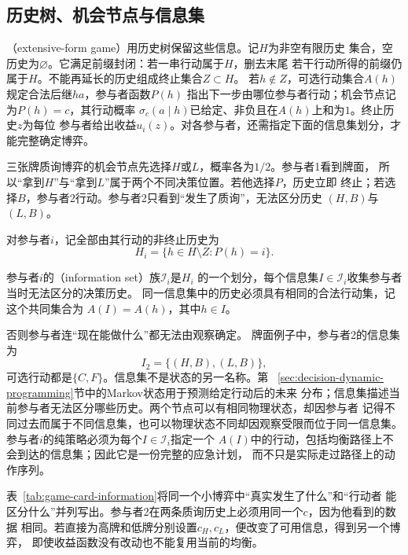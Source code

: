 \subsection{历史树、机会节点与信息集}

\begin{definition}[有限扩展式博弈的历史树]
\label{def:game-finite-extensive-history}
（extensive-form game）用历史树保留这些信息。记\(H\)为非空有限历史
集合，空历史为\(\varnothing\)。它满足前缀封闭：若一串行动属于\(H\)，删去末尾
若干行动所得的前缀仍属于\(H\)。不能再延长的历史组成终止集合\(Z\subset H\)。
若\(h\notin Z\)，可选行动集合\(A(h)\)规定合法后继\(ha\)，参与者函数\(P(h)\)
指出下一步由哪位参与者行动；机会节点记为\(P(h)=c\)，其行动概率
\(\sigma_c(a\mid h)\)已给定、非负且在\(A(h)\)上和为\(1\)。终止历史\(z\)为每位
参与者给出收益\(u_i(z)\)。对各参与者，还需指定下面的信息集划分，才能完整确定博弈。
\end{definition}

三张牌质询博弈的机会节点先选择\(H\)或\(L\)，概率各为\(1/2\)。参与者1看到牌面，
所以“拿到\(H\)”与“拿到\(L\)”属于两个不同决策位置。若他选择\(P\)，历史立即
终止；若选择\(B\)，参与者2行动。参与者2只看到“发生了质询”，无法区分历史
\((H,B)\)与\((L,B)\)。

对参与者\(i\)，记全部由其行动的非终止历史为
\[
  H_i=\{h\in H\setminus Z:P(h)=i\}.
\]
\begin{definition}[信息集]
\label{def:game-information-set}
参与者\(i\)的（information set）族\(\mathcal{I}_i\)是\(H_i\)
的一个划分，每个信息集\(I\in\mathcal{I}_i\)收集参与者当时无法区分的决策历史。
同一信息集中的历史必须具有相同的合法行动集，记这个共同集合为
\(A(I)=A(h)\)，其中\(h\in I\)。
\end{definition}
否则参与者连“现在能做什么”都无法由观察确定。
牌面例子中，参与者2的信息集为
\[
  I_2=\{(H,B),(L,B)\},
\]
可选行动都是\(\{C,F\}\)。信息集不是状态的另一名称。第
~\ref{sec:decision-dynamic-programming}节中的Markov状态用于预测给定行动后的未来
分布；信息集描述当前参与者无法区分哪些历史。两个节点可以有相同物理状态，却因参与者
记得不同过去而属于不同信息集，也可以物理状态不同却因观察受限而位于同一信息集。
参与者\(i\)的纯策略必须为每个\(I\in\mathcal{I}_i\)指定一个
\(A(I)\)中的行动，包括均衡路径上不会到达的信息集；因此它是一份完整的应急计划，
而不只是实际走过路径上的动作序列。

表~\ref{tab:game-card-information}将同一个小博弈中“真实发生了什么”和“行动者
能区分什么”并列写出。参与者2在两条质询历史上必须用同一个$c$，因为他看到的数据
相同。若直接为高牌和低牌分别设置$c_H,c_L$，便改变了可用信息，得到另一个博弈，
即使收益函数没有改动也不能复用当前的均衡。

